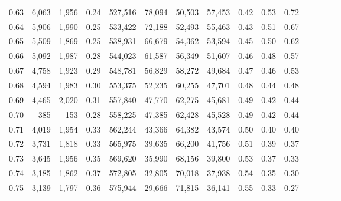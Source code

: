 \begin{tabular}{rrrcrrrrrrrrrrr}
0.63 &   6,063 &  1,956 &                                       0.24 &  527,516 &   78,094 &   50,503 &   57,453 &  0.42 &  0.53 &                         0.72 \\
0.64 &   5,906 &  1,990 &                                       0.25 &  533,422 &   72,188 &   52,493 &   55,463 &  0.43 &  0.51 &                         0.67 \\
0.65 &   5,509 &  1,869 &                                       0.25 &  538,931 &   66,679 &   54,362 &   53,594 &  0.45 &  0.50 &                         0.62 \\
0.66 &   5,092 &  1,987 &                                       0.28 &  544,023 &   61,587 &   56,349 &   51,607 &  0.46 &  0.48 &                         0.57 \\
0.67 &   4,758 &  1,923 &                                       0.29 &  548,781 &   56,829 &   58,272 &   49,684 &  0.47 &  0.46 &                         0.53 \\
0.68 &   4,594 &  1,983 &                                       0.30 &  553,375 &   52,235 &   60,255 &   47,701 &  0.48 &  0.44 &                         0.48 \\
0.69 &   4,465 &  2,020 &                                       0.31 &  557,840 &   47,770 &   62,275 &   45,681 &  0.49 &  0.42 &                         0.44 \\
0.70 &     385 &    153 &                                       0.28 &  558,225 &   47,385 &   62,428 &   45,528 &  0.49 &  0.42 &                         0.44 \\
0.71 &   4,019 &  1,954 &                                       0.33 &  562,244 &   43,366 &   64,382 &   43,574 &  0.50 &  0.40 &                         0.40 \\
0.72 &   3,731 &  1,818 &                                       0.33 &  565,975 &   39,635 &   66,200 &   41,756 &  0.51 &  0.39 &                         0.37 \\
0.73 &   3,645 &  1,956 &                                       0.35 &  569,620 &   35,990 &   68,156 &   39,800 &  0.53 &  0.37 &                         0.33 \\
0.74 &   3,185 &  1,862 &                                       0.37 &  572,805 &   32,805 &   70,018 &   37,938 &  0.54 &  0.35 &                         0.30 \\
0.75 &   3,139 &  1,797 &                                       0.36 &  575,944 &   29,666 &   71,815 &   36,141 &  0.55 &  0.33 &                         0.27 \\

\end{tabular}
